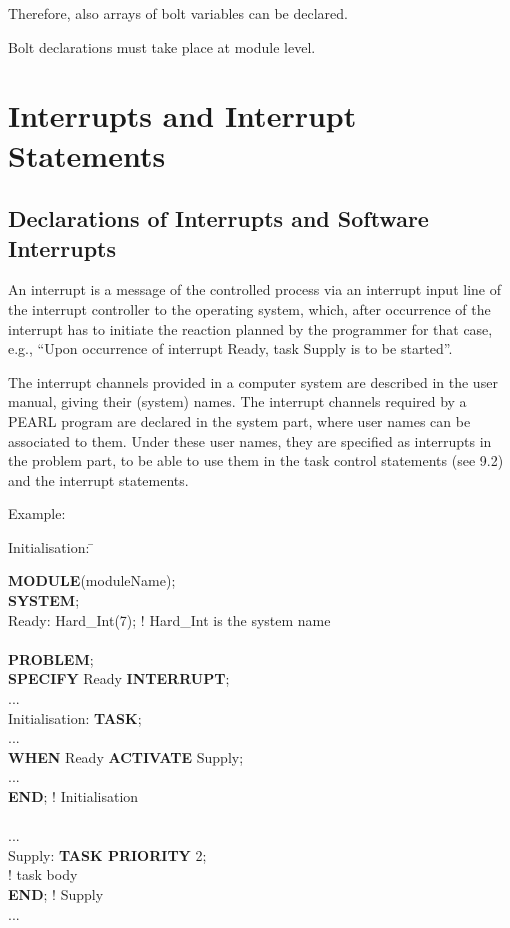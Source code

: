 Therefore, also arrays of bolt variables can be declared.

Bolt declarations must take place at module level.


\section{Interrupts and Interrupt Statements}   %
\label{sec_interrupts}

\subsection{Declarations of Interrupts and Software Interrupts}    %

An interrupt is a message of the controlled process via an interrupt
input line of the interrupt controller to the operating system, which,
after occurrence of the interrupt has to initiate the reaction planned
by the programmer for that case, e.g., ``Upon occurrence of interrupt
Ready, task Supply is to be started''.

The interrupt channels provided in a computer system are described in the
user manual, giving their (system) names. The interrupt channels required
by a PEARL program are declared in the system part, where user names can
be associated to them. Under these user names, they are specified as
interrupts in the problem part, to be able to use them in the task
control statements (see 9.2) and the interrupt statements.

Example:

\begin{tabbing}
Initialisation: \= \kill

{\bf MODULE}(moduleName); \> \\
{\bf SYSTEM}; \> \\
\x Ready: Hard\_Int(7); ! Hard\_Int is the system name \> \\
   \> \\
{\bf PROBLEM}; \> \\
{\bf SPECIFY} Ready {\bf INTERRUPT}; \> \\
... \> \\
Initialisation: \> {\bf TASK}; \\
  \> ... \\
  \> {\bf WHEN} Ready {\bf ACTIVATE} Supply; \\
  \> ... \\
  \> {\bf END}; ! Initialisation \\
  \> \\
...             \> \\
Supply:         \> {\bf TASK PRIORITY} 2;\\
  \> ! task body \\
  \> {\bf END}; ! Supply \\
...             \>
\end{tabbing}


